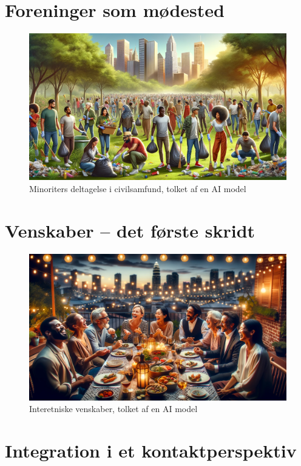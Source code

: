 \documentclass[
]{book}
\begin{document}
\hypertarget{kap5}{%
\chapter{Foreninger som mødested}\label{kap5}}

\begin{figure}
\includegraphics[width=24.89in]{images/dalle-civil} \caption{Minoriters deltagelse i civilsamfund, tolket af en AI model}\label{fig:fig-civil}
\end{figure}

\hypertarget{kap6}{%
\chapter{Venskaber -- det første skridt}\label{kap6}}

\begin{figure}
\includegraphics[width=24.89in]{images/dalle-friendships} \caption{Interetniske venskaber, tolket af en AI model}\label{fig:fig-friendships}
\end{figure}

\hypertarget{kap7}{%
\chapter{Integration i et kontaktperspektiv}\label{kap7}}
\end{document}
